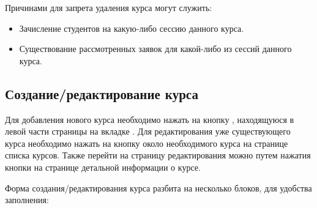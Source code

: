 Причинами для запрета удаления курса могут служить:
\begin{itemize}
	\item Зачисление студентов на какую-либо сессию данного курса.
	\item Существование рассмотренных заявок для какой-либо из сессий данного курса.
\end{itemize}
\subsection{Создание/редактирование курса}
\label{course:subsec:course_create}
Для добавления нового курса необходимо нажать на кнопку , находящуюся в левой части страницы на вкладке .
Для редактирования уже существующего курса необходимо нажать на кнопку  около необходимого курса на странице списка курсов.
Также перейти на страницу редактирования можно путем нажатия кнопки  на странице детальной информации о курсе.

Форма создания/редактирования курса разбита на несколько блоков, для удобства заполнения:
